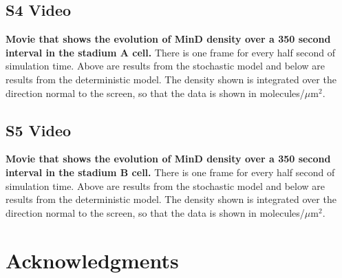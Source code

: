\documentclass[10pt,letterpaper]{article}
\newcommand\micron{\ensuremath{\mu\text{m}}}
\begin{document}
\subsection*{S4 Video}
\label{movie-MinD-density-stadium-A}
{\bf Movie that shows the evolution of MinD density over a 350 second
  interval in the stadium A cell.}  There is one frame for every half
second of simulation time. Above are results from the stochastic model
and below are results from the deterministic model.  The density shown
is integrated over the direction normal to the screen, so that the
data is shown in molecules/$\micron^2$.

\subsection*{S5 Video}
\label{movie-MinD-density-stadium-B}
{\bf Movie that shows the evolution of MinD density over a 350 second
  interval in the stadium B cell.}  There is one frame for every half
second of simulation time. Above are results from the stochastic model
and below are results from the deterministic model.  The density shown
is integrated over the direction normal to the screen, so that the
data is shown in molecules/$\micron^2$.

\section*{Acknowledgments}

\nolinenumbers



\end{document}
